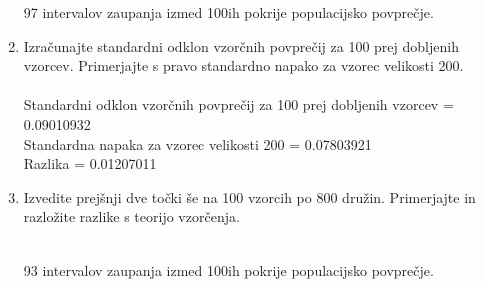 \documentclass[a4paper]{article}
\begin{document}
\begin{enumerate}[label=(\alph*)]
97 intervalov zaupanja izmed 100ih pokrije populacijsko povprečje.


\item Izračunajte standardni odklon vzorčnih povprečij za 100 prej dobljenih vzorcev. Primerjajte s pravo standardno napako za vzorec velikosti 200. \\ \\
Standardni odklon vzorčnih povprečij za 100 prej dobljenih vzorcev = 0.09010932 \\
Standardna napaka za vzorec velikosti 200 = 0.07803921 \\
Razlika = 0.01207011 

\item Izvedite prejšnji dve točki še na 100 vzorcih po 800 družin. Primerjajte in razložite razlike s teorijo vzorčenja. \\ \

93 intervalov zaupanja izmed 100ih pokrije populacijsko povprečje.

\end{enumerate}
\end{document}
